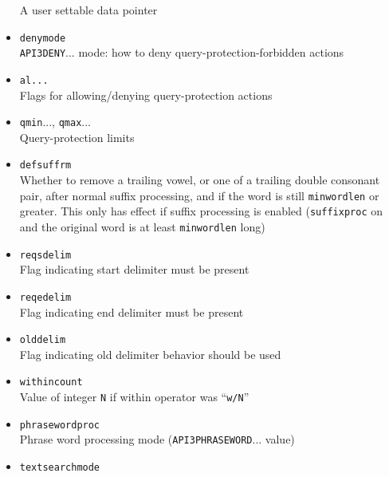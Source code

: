 \begin{itemize}
    A user settable data pointer
  \item \verb`denymode` \\
    \verb`API3DENY`... mode: how to deny query-protection-forbidden actions
  \item \verb`al...` \\
    Flags for allowing/denying query-protection actions
  \item \verb`qmin`..., \verb`qmax`... \\
    Query-protection limits
  \item \verb`defsuffrm` \\
    Whether to remove a trailing vowel, or one of a trailing double
    consonant pair, after normal suffix processing, and if the word is
    still \verb`minwordlen` or greater.  This only has effect if
    suffix processing is enabled (\verb`suffixproc` on and the
    original word is at least \verb`minwordlen` long)
  \item \verb`reqsdelim` \\
    Flag indicating start delimiter must be present
  \item \verb`reqedelim` \\
    Flag indicating end delimiter must be present
  \item \verb`olddelim` \\
    Flag indicating old delimiter behavior should be used
  \item \verb`withincount` \\
    Value of integer \verb`N` if within operator was ``\verb`w/N`''
  \item \verb`phrasewordproc` \\
    Phrase word processing mode (\verb`API3PHRASEWORD`... value)
  \item \verb`textsearchmode` \\

\end{itemize}

